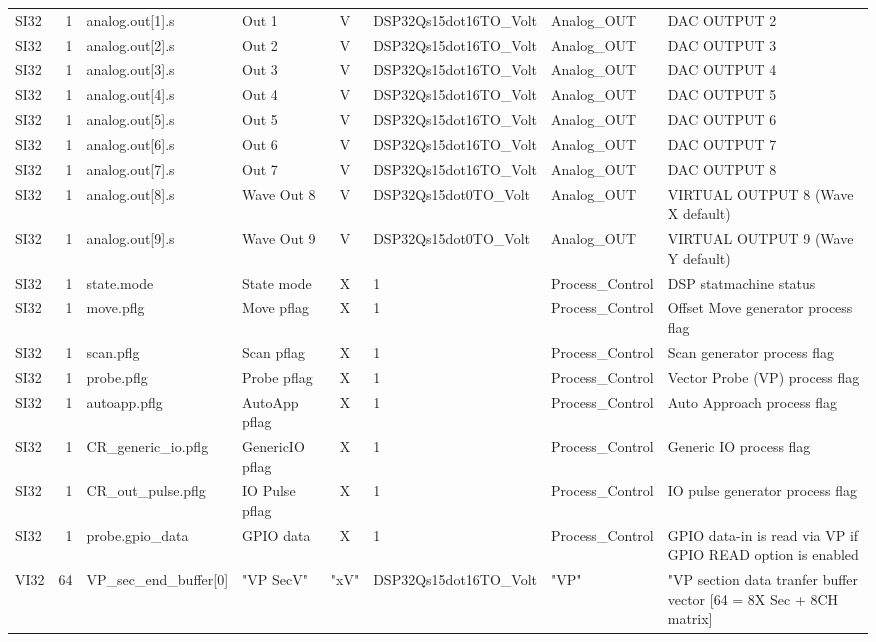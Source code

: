 \begin{tabular}{|l|r|l|l|c|l|l|l|}
SI32 & 1 & analog.out[1].s &  Out 1 &  V &  DSP32Qs15dot16TO\_Volt &  Analog\_OUT &  DAC OUTPUT 2 \\
SI32 & 1 & analog.out[2].s &  Out 2 &  V &  DSP32Qs15dot16TO\_Volt &  Analog\_OUT &  DAC OUTPUT 3 \\
SI32 & 1 & analog.out[3].s &  Out 3 &  V &  DSP32Qs15dot16TO\_Volt &  Analog\_OUT &  DAC OUTPUT 4 \\
SI32 & 1 & analog.out[4].s &  Out 4 &  V &  DSP32Qs15dot16TO\_Volt &  Analog\_OUT &  DAC OUTPUT 5 \\
SI32 & 1 & analog.out[5].s &  Out 5 &  V &  DSP32Qs15dot16TO\_Volt &  Analog\_OUT &  DAC OUTPUT 6 \\
SI32 & 1 & analog.out[6].s &  Out 6 &  V &  DSP32Qs15dot16TO\_Volt &  Analog\_OUT &  DAC OUTPUT 7 \\
SI32 & 1 & analog.out[7].s &  Out 7 &  V &  DSP32Qs15dot16TO\_Volt &  Analog\_OUT &  DAC OUTPUT 8 \\
SI32 & 1 & analog.out[8].s &  Wave Out 8 &  V &  DSP32Qs15dot0TO\_Volt &  Analog\_OUT &  VIRTUAL OUTPUT 8 (Wave X default) \\
SI32 & 1 & analog.out[9].s &  Wave Out 9 &  V &  DSP32Qs15dot0TO\_Volt &  Analog\_OUT &  VIRTUAL OUTPUT 9 (Wave Y default) \\
SI32 & 1 & state.mode &          State mode &       X &  1 &  Process\_Control &  DSP statmachine status \\
SI32 & 1 & move.pflg &           Move pflag &       X &  1 &  Process\_Control &  Offset Move generator process flag \\
SI32 & 1 & scan.pflg &           Scan pflag &       X &  1 &  Process\_Control &  Scan generator process flag \\
SI32 & 1 & probe.pflg &          Probe pflag &      X &  1 &  Process\_Control &  Vector Probe (VP) process flag \\
SI32 & 1 & autoapp.pflg &        AutoApp pflag &    X &  1 &  Process\_Control &  Auto Approach process flag \\
SI32 & 1 & CR\_generic\_io.pflg &  GenericIO pflag &  X &  1 &  Process\_Control &  Generic IO process flag \\
SI32 & 1 & CR\_out\_pulse.pflg &   IO Pulse pflag &   X &  1 &  Process\_Control &  IO pulse generator process flag \\
SI32 & 1 & probe.gpio\_data &     GPIO data &        X &  1 &  Process\_Control &  GPIO data-in is read via VP if GPIO READ option is enabled \\
VI32 & 64 &  VP\_sec\_end\_buffer[0] &  "VP SecV" &   "xV" &  DSP32Qs15dot16TO\_Volt &  "VP" &  "VP section data tranfer buffer vector [64 = 8X Sec + 8CH matrix] \\
\hline
\end{tabular}

